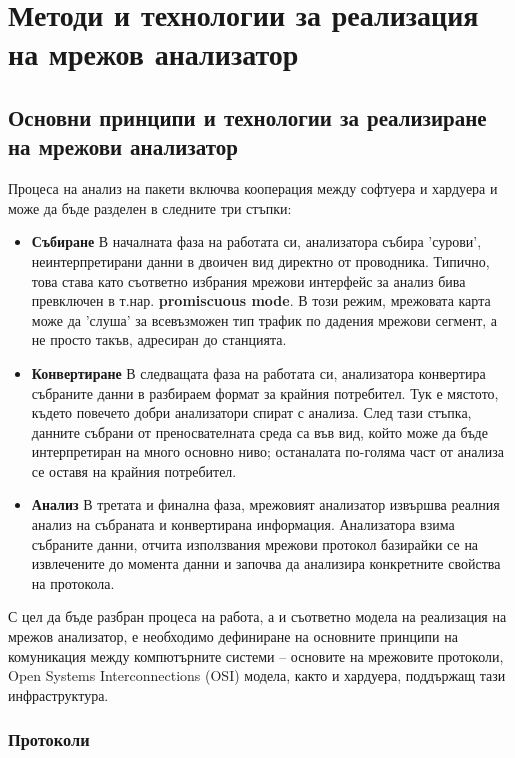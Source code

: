 \documentclass[12pt,a4paper,oneside]{book}
\begin{document}
\justify
\chapter{Методи и технологии за реализация на мрежов анализатор}

\section{Основни принципи и технологии за реализиране на мрежови анализатор}
Процеса на анализ на пакети включва кооперация между софтуера и хардуера и може
да бъде разделен в следните три стъпки:

\begin{itemize}
  \item
    \textbf{Събиране} В началната фаза на работата си, анализатора събира
    'сурови', неинтерпретирани данни в двоичен вид директно от проводника.
    Типично, това става като съответно избрания мрежови интерфейс за анализ
    бива превключен в т.нар.  \textbf{promiscuous mode}. В този режим, мрежовата карта
    може да 'слуша' за всевъзможен тип трафик по дадения мрежови сегмент, а не
    просто такъв, адресиран до станцията.
  \item
    \textbf{Конвертиране} В следващата фаза на работата си, анализатора
    конвертира събраните данни в разбираем формат за крайния потребител. Тук е
    мястото, където повечето добри анализатори спират с анализа. След тази
    стъпка, данните събрани от преносвателната среда са във вид, който може да
    бъде интерпретиран на много основно ниво; останалата по-голяма част от
    анализа се оставя на крайния потребител.
  \item
    \textbf{Анализ} В третата и финална фаза, мрежовият анализатор извършва
    реалния анализ на събраната и конвертирана информация. Анализатора взима
    събраните данни, отчита използвания мрежови протокол базирайки се на
    извлечените до момента данни и започва да анализира конкретните свойства на
    протокола.
\end{itemize}

С цел да бъде разбран процеса на работа, а и съответно модела на реализация на
мрежов анализатор, е необходимо дефиниране на основните принципи на
комуникация между компютърните системи -- основите на мрежовите протоколи,
Open Systems Interconnections (OSI) модела, както и хардуера, поддържащ тази
инфраструктура.

\subsection{Протоколи}
\end{document}
